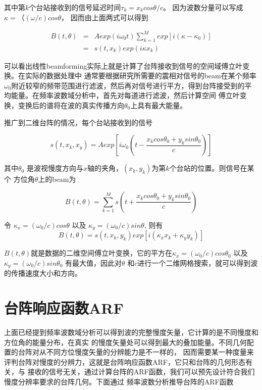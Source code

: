 其中第$k$个台站接收到的信号延迟时间$\tau_{k} = x_k cos\theta /c$。 因为波数分量可以写成
$\kappa = （(\omega /c) cos \theta$， 因而由上面两式可以得到 

\begin{eqnarray}
B(t,\theta) & = & A exp(i \omega_{0} t) \sum_{k=1}^{M} exp[i (\kappa - \kappa_{0})] \\
 & = &  s(t,x_k) exp(i\kappa x_k)
\end{eqnarray}

可以看出线性beamforming实际上就是计算了台阵接收到信号的空间域傅立叶变换。在实际的数据处理中
通常要根据研究所需要的震相对信号的beam在某个频率$\omega_{0}$附近较窄的频带范围进行滤波，然后再对信号进行平方，得到台阵接受到的平均能量。在频率波数域分析中，首先对每道进行滤波，然后计算空间
傅立叶变换，变换后的谱将在波的真实传播方向$\theta_{0}$上具有最大能量。

推广到二维台阵的情况，每个台站接收到的信号

\begin{equation}
s(t,x_k,x_y) = A exp\left[ i \omega_{0} \left( t - %
\frac{x_k cos \theta_0 + y_k sin \theta _0}{c} \right) \right]
\end{equation}

其中$\theta_0$ 是波视慢度方向与$x$轴的夹角，$(x_k,y_k)$为第$k$个台站的位置。则信号在某个
方位角$\theta$上的beam为

\begin{equation}
B(t,\theta) = \sum_{k=1}^{M} s\left( t + %
\frac{x_k cos \theta_0 + y_k sin \theta _0}{c} \right)
\end{equation}

令 $\kappa_x = (\omega_0 /c)cos\theta$ 以及 $\kappa_y = (\omega_0 /c)sin\theta$,
则有
\begin{equation}
B(t,\theta) = s(t,x_k,y_k) exp[i(\kappa_x x_k + \kappa_y y_k)]
\end{equation}

$B(t,\theta)$就是数据的二维空间傅立叶变换，它的平方在$\kappa_x = (\omega_0%
/c)cos\theta_0$ 以及 $\kappa_y = (\omega_0 /c)sin\theta_0$ 有最大值，因此对$\theta$
和$c$进行一个二维网格搜索，就可以得到波的传播速度大小和方向。

\section{台阵响应函数ARF}

上面已经提到频率波数域分析可以得到波的完整慢度矢量，它计算的是不同慢度和方位角的能量分布，在真实
的慢度矢量处可以得到最大的叠加能量。不同几何配置的台阵对从不同方位慢度矢量的分辨能力是不一样的，
因而需要某一种度量来评判台阵对慢度的分辨力，这就是台阵响应函数ARF，它只和台阵的几何形态有关，与
接收的信号无关，通过计算台阵的ARF函数，我们可以预先设计符合我们慢度分辨率要求的台阵几何。下面通过
频率波数分析推导台阵的ARF函数\citep{Rost2002}

